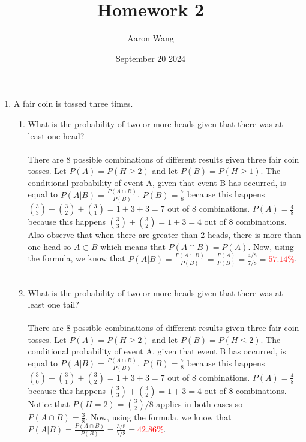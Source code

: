 \documentclass{article}
\title{Homework 2}
\author{Aaron Wang}
\date{September 20 2024}
\newcommand{\intersect}{\cap}
\begin{document}
\maketitle
    \begin{enumerate}
        \item A fair coin is tossed three times.
        \begin{enumerate}
            \item What is the probability of two or more heads given that there was at least one head?\\\\
            There are 8 possible combinations of different results given three fair coin tosses.
            Let $P(A)=P(H\geq2)$ and let $P(B)=P(H \geq 1)$. The conditional probability of event A, given that event B has occurred, is equal to $P(A|B)=\frac{P(A\intersect B)}{P(B)}$.
            $P(B)=\frac{7}{8}$ because this happens $\binom{3}{3} + \binom{3}{2} + \binom{3}{1}= 1+3+3=7$ out of 8 combinations.
            $P(A)=\frac{4}{8}$ because this happens $\binom{3}{3} + \binom{3}{2} = 1+3=4$ out of 8 combinations. 
            Also observe that when there are greater than 2 heads, there is more than one head so $A \subset B$ which means that $P(A\intersect B) = P(A)$. 
            Now, using the formula, we know that $P(A|B)=\frac{P(A\intersect B)}{P(B)}=\frac{P(A)}{P(B)}=\frac{4/8}{7/8}=$\textcolor{red}{$57.14\%$}.
            \\\\
            \item What is the probability of two or more heads given that there was at least one tail?\\\\
            There are 8 possible combinations of different results given three fair coin tosses.
            Let $P(A)=P(H\geq2)$ and let $P(B)=P(H \leq 2)$. The conditional probability of event A, given that event B has occurred, is equal to $P(A|B)=\frac{P(A\intersect B)}{P(B)}$.
            $P(B)=\frac{7}{8}$ because this happens $\binom{3}{0} + \binom{3}{1} + \binom{3}{2}= 1+3+3=7$ out of 8 combinations.
            $P(A)=\frac{4}{8}$ because this happens $\binom{3}{3} + \binom{3}{2} = 1+3=4$ out of 8 combinations. 
            Notice that $P(H=2)=\binom{3}{2}/8$ applies in both cases so $P(A\intersect B)=\frac{3}{8}$.
            Now, using the formula, we know that $P(A|B)=\frac{P(A\intersect B)}{P(B)}=\frac{3/8}{7/8}=$\textcolor{red}{$42.86\%$}.
            \\\\

\end{enumerate}
\end{enumerate}
\end{document}
